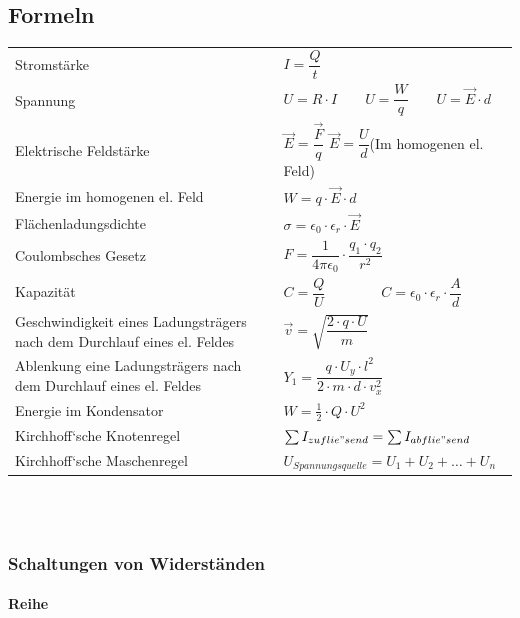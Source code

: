 \documentclass[a4paper]{article}
\begin{document}
\subsection{Formeln}

\renewcommand{\arraystretch}{4}
\begin{tabular}{p{6cm} p{10cm}}
	Stromstärke																	& $I = \dfrac{Q}{t}$\\
	Spannung																	& $U = R \cdot I  \qquad U = \dfrac{W}{q}  \qquad U = \vec{E} \cdot d$\\
	Elektrische Feldstärke														& $\vec{E} = \dfrac{\vec{F}}{q}$ \qquad $\vec{E} = \dfrac{U}{d}$\qquad \small(Im homogenen el. Feld)\\
	Energie im homogenen el. Feld												& $W = q \cdot \vec{E} \cdot d$\\
	Flächenladungsdichte														& $\sigma = \epsilon_0 \cdot \epsilon_r \cdot \vec{E}$\\
	Coulombsches Gesetz															& $F = \dfrac{1}{4 \pi \epsilon_0} \cdot \dfrac{q_1 \cdot q_2}{r^2}$\\
	Kapazität																	& $C = \dfrac{Q}{U} \qquad\qquad C = \epsilon_0 \cdot \epsilon_r \cdot \dfrac{A}{d}$\\
	Geschwindigkeit eines Ladungsträgers nach dem Durchlauf eines el. Feldes	& $\vec{v} = \sqrt{\dfrac{2 \cdot q \cdot U}{m}}$\\
	Ablenkung eine Ladungsträgers nach dem Durchlauf eines el. Feldes			& $Y_1 = \dfrac{q \cdot U_y \cdot l^2}{2 \cdot m \cdot d \cdot v_x ^2}$\\
	Energie im Kondensator														& $W = \frac{1}{2} \cdot Q \cdot U^2$\\
	Kirchhoff‘sche Knotenregel													& $\sum{I_{zuflie"send}} = \sum{I_{abflie"send}}$\\
	Kirchhoff‘sche Maschenregel													& $U_{Spannungsquelle} = U_1  +  U_2 + \dots + U_n$\\
\end{tabular}
\renewcommand{\arraystretch}{1}
\\\\


\subsubsection{Schaltungen von Widerständen}
\paragraph{Reihe}
\end{document}
